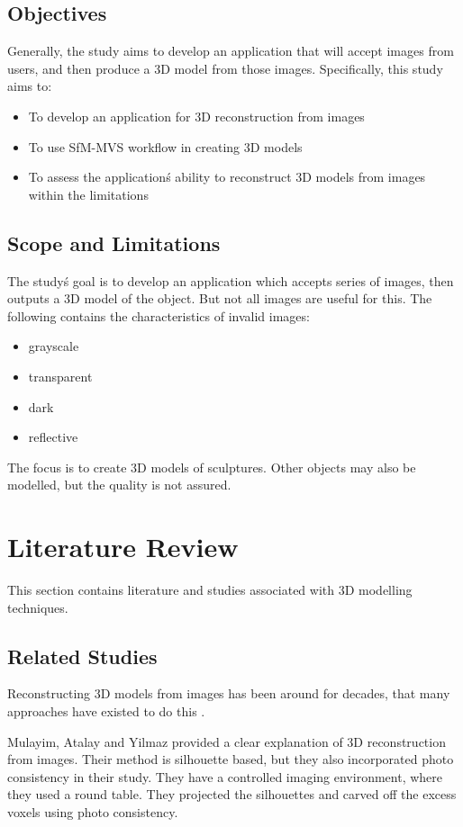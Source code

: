\documentclass[journal]{./IEEE/IEEEtran}
\begin{document}
\subsection{Objectives}
Generally, the study aims to develop an application that will accept images from users, and then produce a 3D model from those images. Specifically, this study aims to:

\begin{itemize}
\item To develop an application for 3D reconstruction from images
\item To use SfM-MVS workflow in creating 3D models
\item To assess the application\'s ability to reconstruct 3D models from images within the limitations
\end{itemize}

\subsection{Scope and Limitations}
The study\'s goal is to develop an application which accepts series of images, then outputs a 3D model of the object. But not all images are useful for this. The following contains the characteristics of invalid images:

\begin{itemize}
\item grayscale
\item transparent
\item dark
\item reflective
\end{itemize}

The focus is to create 3D models of sculptures. Other objects may also be modelled, but the quality is not assured.

\section{Literature Review}
This section contains literature and studies associated with 3D modelling techniques.

\subsection{Related Studies}
Reconstructing 3D models from images has been around for decades, that many approaches have existed to do this \cite{Paris}.

Mulayim, Atalay and Yilmaz \cite{MulayimAtalayYilmaz} provided a clear explanation of 3D reconstruction from images. Their method is silhouette based, but they also incorporated photo consistency in their study. They have a controlled imaging environment, where they used a round table. They projected the silhouettes and carved off the excess voxels using photo consistency. 
\end{document}
